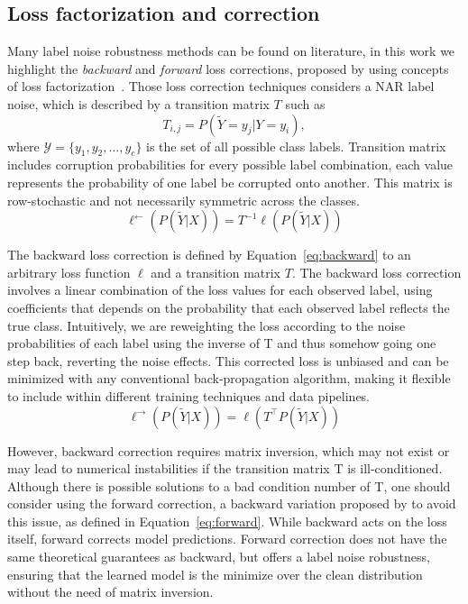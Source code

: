 \subsection{Loss factorization and correction}
    
Many label noise robustness methods can be found on literature, in this work we highlight the \textit{backward} and \textit{forward} loss corrections, proposed by \cite{Patrini2017} using concepts of loss factorization~\citep{Patrini2016}. Those loss correction techniques considers a NAR label noise, which is described by a transition matrix $T$ such as 
\begin{equation}
    T_{i,j} = P(\tilde{Y} = y_j|Y = y_i),
\end{equation}
where $\mathcal{Y} = \{y_1, y_2, \ldots, y_c\}$ is the set of all possible class labels. Transition matrix includes corruption probabilities for every possible label combination, each value represents the probability of one label be corrupted onto another. This matrix is row-stochastic and not necessarily symmetric across the classes.
\begin{equation} \label{eq:backward}
    \ell^{\leftarrow}(P(\tilde{Y}|X)) = T^{-1} \ell(P(\tilde{Y}|X))
\end{equation}

The backward loss correction is defined by Equation~\ref{eq:backward} to an arbitrary loss function $\ell$ and a transition matrix $T$. The backward loss correction involves a linear combination of the loss values for each observed label, using coefficients that depends on the probability that each observed label reflects the true class. Intuitively, we are reweighting the loss according to the noise probabilities of each label using the inverse of T and thus somehow going one step back, reverting the noise effects. This corrected loss is unbiased and can be minimized with any conventional back-propagation algorithm, making it flexible to include within different training techniques and data pipelines.
\begin{equation} \label{eq:forward}
    \ell^{\rightarrow}(P(\tilde{Y}|X)) = \ell(T^{\top} P(\tilde{Y}|X))
\end{equation}

However, backward correction requires matrix inversion, which may not exist or may lead to numerical instabilities if the transition matrix T is ill-conditioned. Although there is possible solutions to a bad condition number of T, one should consider using the forward correction, a backward variation proposed by \cite{Patrini2017} to avoid this issue, as defined in Equation~\ref{eq:forward}. While backward acts on the loss itself, forward corrects model predictions. Forward correction does not have the same theoretical guarantees as backward, but offers a label noise robustness, ensuring that the learned model is the minimize over the clean distribution without the need of matrix inversion.

